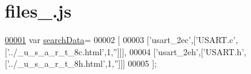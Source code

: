 \hypertarget{files__8_8js_source}{}\section{files\+\_.\+js}
\label{files__8_8js_source}

\begin{DoxyCode}
\hypertarget{files__8_8js_source.tex_l00001}{}\hyperlink{files__8_8js_ad01a7523f103d6242ef9b0451861231e}{00001} var \hyperlink{files__8_8js_ad01a7523f103d6242ef9b0451861231e}{searchData}=
00002 [
00003   [\textcolor{stringliteral}{'usart\_2ec'},[\textcolor{stringliteral}{'USART.c'},[\textcolor{stringliteral}{'../\_u\_s\_a\_r\_t\_8c.html'},1,\textcolor{stringliteral}{''}]]],
00004   [\textcolor{stringliteral}{'usart\_2eh'},[\textcolor{stringliteral}{'USART.h'},[\textcolor{stringliteral}{'../\_u\_s\_a\_r\_t\_8h.html'},1,\textcolor{stringliteral}{''}]]]
00005 ];
\end{DoxyCode}
